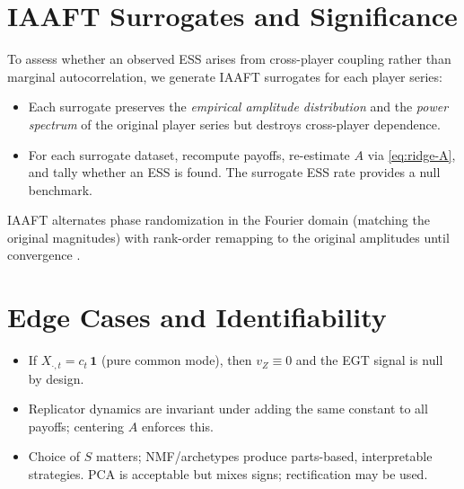 \documentclass[11pt]{article}
\newcommand{\one}{\mathbf{1}}
\begin{document}
\section{IAAFT Surrogates and Significance}
To assess whether an observed ESS arises from cross-player coupling rather than marginal autocorrelation, we generate IAAFT surrogates for each player series:
\begin{itemize}[leftmargin=*]
\item Each surrogate preserves the \emph{empirical amplitude distribution} and the \emph{power spectrum} of the original player series but destroys cross-player dependence.
\item For each surrogate dataset, recompute payoffs, re-estimate $A$ via \eqref{eq:ridge-A}, and tally whether an ESS is found. The surrogate ESS rate provides a null benchmark.
\end{itemize}
IAAFT alternates phase randomization in the Fourier domain (matching the original magnitudes) with rank-order remapping to the original amplitudes until convergence \cite{schreiber-schmitz}.

\section{Edge Cases and Identifiability}
\begin{itemize}[leftmargin=*]
\item If $X_{\cdot,t}=c_t\,\one$ (pure common mode), then $v_Z\equiv 0$ and the EGT signal is null by design.
\item Replicator dynamics are invariant under adding the same constant to all payoffs; centering $A$ enforces this.
\item Choice of $S$ matters; NMF/archetypes produce parts-based, interpretable strategies. PCA is acceptable but mixes signs; rectification may be used.
\end{itemize}
\end{document}
